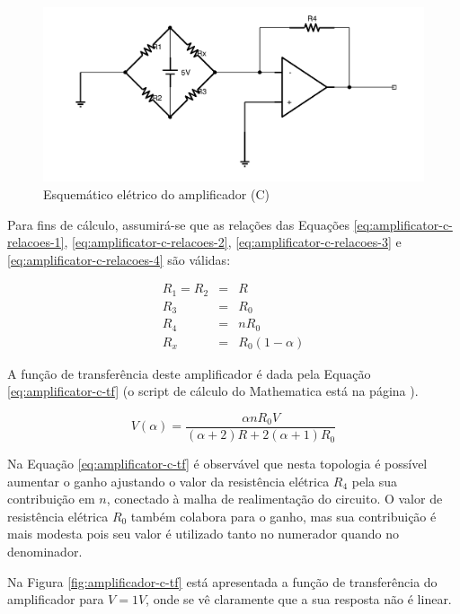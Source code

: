 \documentclass[a4paper]{instrumentacao}
\begin{document}
\begin{figure}[H]
\center
\includegraphics[width=\textwidth]{Amplificador-C.pdf}
\caption{Esquemático elétrico do amplificador (C)}
\label{fig:amplificador-c}
\end{figure}

Para fins de cálculo, assumirá-se que as relações das Equações \ref{eq:amplificator-c-relacoes-1}, \ref{eq:amplificator-c-relacoes-2}, \ref{eq:amplificator-c-relacoes-3} e \ref{eq:amplificator-c-relacoes-4} são válidas:

\begin{eqnarray}
	R_1 = R_2 &=& R \label{eq:amplificator-c-relacoes-1} \\
	R_3 &=& R_0  		\label{eq:amplificator-c-relacoes-2} \\
	R_4 &=& n R_0 		\label{eq:amplificator-c-relacoes-3} \\
	R_x &=& R_0(1-\alpha) 	\label{eq:amplificator-c-relacoes-4} 
\end{eqnarray}

A função de transferência deste amplificador é dada pela Equação \ref{eq:amplificator-c-tf} (o script de cálculo do Mathematica está na página \pageref{att:amplificadores}).

\begin{equation}
	V(\alpha) = \frac{\alpha n R_0 V}{(\alpha +2) R+2 (\alpha +1) R_0}
	\label{eq:amplificator-c-tf}
\end{equation}

Na Equação \ref{eq:amplificator-c-tf} é observável que nesta topologia é possível aumentar o ganho ajustando o valor da resistência elétrica $R_4$ pela sua contribuição em $n$, conectado à malha de realimentação do circuito. O valor de resistência elétrica $R_0$ também colabora para o ganho, mas sua contribuição é mais modesta pois seu valor é utilizado tanto no numerador quando no denominador.

Na Figura \ref{fig:amplificador-c-tf} está apresentada a função de transferência do amplificador para $V=1V$, onde se vê claramente que a sua resposta não é linear.
\end{document}
